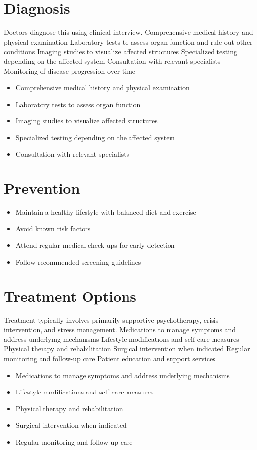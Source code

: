 \section{Diagnosis}
Doctors diagnose this using clinical interview. Comprehensive medical history and physical examination Laboratory tests to assess organ function and rule out other conditions Imaging studies to visualize affected structures Specialized testing depending on the affected system Consultation with relevant specialists Monitoring of disease progression over time

\begin{itemize}[noitemsep]
  \item Comprehensive medical history and physical examination
  \item Laboratory tests to assess organ function
  \item Imaging studies to visualize affected structures
  \item Specialized testing depending on the affected system
  \item Consultation with relevant specialists
\end{itemize}
\section{Prevention}
\begin{itemize}[noitemsep]
  \item Maintain a healthy lifestyle with balanced diet and exercise
  \item Avoid known risk factors
  \item Attend regular medical check-ups for early detection
  \item Follow recommended screening guidelines
\end{itemize}
\section{Treatment Options}
Treatment typically involves primarily supportive psychotherapy, crisis intervention, and stress management. Medications to manage symptoms and address underlying mechanisms Lifestyle modifications and self-care measures Physical therapy and rehabilitation Surgical intervention when indicated Regular monitoring and follow-up care Patient education and support services

\begin{itemize}[noitemsep]
  \item Medications to manage symptoms and address underlying mechanisms
  \item Lifestyle modifications and self-care measures
  \item Physical therapy and rehabilitation
  \item Surgical intervention when indicated
  \item Regular monitoring and follow-up care
\end{itemize}
